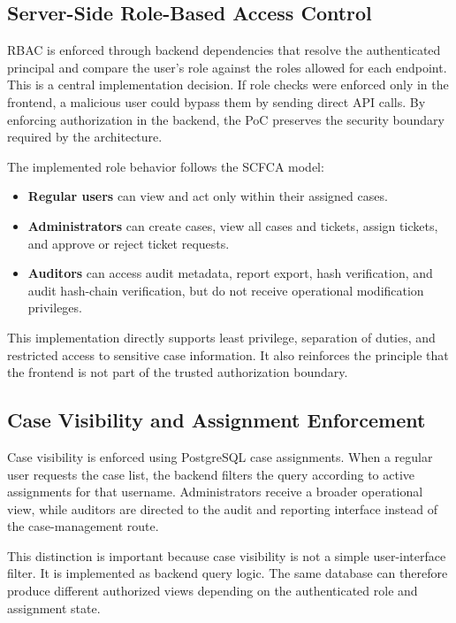 \documentclass[12pt,a4paper]{report}
\begin{document}
\subsection{Server-Side Role-Based Access Control}

RBAC is enforced through backend dependencies that resolve the authenticated principal and compare the user's role against the roles allowed for each endpoint. This is a central implementation decision. If role checks were enforced only in the frontend, a malicious user could bypass them by sending direct API calls. By enforcing authorization in the backend, the PoC preserves the security boundary required by the architecture.

The implemented role behavior follows the SCFCA model:

\begin{itemize}
    \item \textbf{Regular users} can view and act only within their assigned cases.
    \item \textbf{Administrators} can create cases, view all cases and tickets, assign tickets, and approve or reject ticket requests.
    \item \textbf{Auditors} can access audit metadata, report export, hash verification, and audit hash-chain verification, but do not receive operational modification privileges.
\end{itemize}

This implementation directly supports least privilege, separation of duties, and restricted access to sensitive case information. It also reinforces the principle that the frontend is not part of the trusted authorization boundary.

\subsection{Case Visibility and Assignment Enforcement}

Case visibility is enforced using PostgreSQL case assignments. When a regular user requests the case list, the backend filters the query according to active assignments for that username. Administrators receive a broader operational view, while auditors are directed to the audit and reporting interface instead of the case-management route.

This distinction is important because case visibility is not a simple user-interface filter. It is implemented as backend query logic. The same database can therefore produce different authorized views depending on the authenticated role and assignment state.
\end{document}
